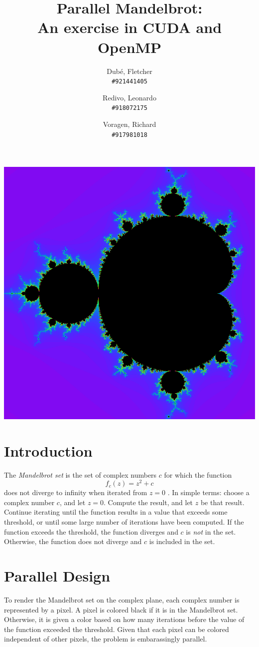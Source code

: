 \documentclass{article}
\author{
	Dub\'e, Fletcher\\
	\texttt{\#921441405}
	\and
	Redivo, Leonardo\\
	\texttt{\#918072175}
	\and
	Voragen, Richard\\
	\texttt{\#917981018}
}
\title{Parallel Mandelbrot: \\An exercise in CUDA and OpenMP}
\begin{document}
\maketitle

\includegraphics[width=\textwidth]{gallery/overview.png}

\section{Introduction} \label{sec:intro}
    The \emph{Mandelbrot set} is the set of complex numbers $c$ for which the function
    \begin{equation} \label{eq:mandelbrot}
    f_c(z) = z^2 + c
    \end{equation}
    does not diverge to infinity when iterated from $z = 0$ \cite{mandel_wiki}. In simple terms: choose a complex number $c$, and let $z = 0$. Compute the result, and let $z$ be that result. Continue iterating until the function results in a value that exceeds some threshold, or until some large number of iterations have been computed. If the function exceeds the threshold, the function diverges and $c$ is \emph{not} in the set. Otherwise, the function does not diverge and $c$ is included in the set.

\section{Parallel Design}
    To render the Mandelbrot set on the complex plane, each complex number is represented by a pixel. A pixel is colored black if it is in the Mandelbrot set. Otherwise, it is given a color based on how many iterations before the value of the function exceeded the threshold. Given that each pixel can be colored independent of other pixels, the problem is embarassingly parallel.
\end{document}

